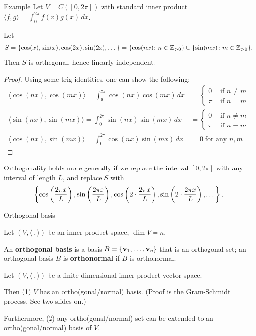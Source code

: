 \begin{frame}{Example}
Let $V=C([0,2\pi])$ with standard inner product $\langle f, g\rangle=\int_0^{2\pi} f(x)g(x) \, dx$. 

Let \[ S=\{\cos(x),\sin(x),\cos(2x),\sin(2x), \dots\}=\{\cos(nx)\colon n\in{\mathbb Z}_{>0}\}\cup\{\sin(mx)\colon m\in{\mathbb Z}_{>0}\}.\] Then $S$ is orthogonal, hence linearly independent. 
\pause
\begin{proof}
Using some trig identities, one can show the following:
\begin{align*}
\langle \cos(nx),\cos(mx)\rangle=\int_0^{2\pi}\cos(nx)\cos(mx)\, dx&=\begin{cases} 0& \text{ if $n\ne m$} \\ \pi& \text{ if $n=m$} \end{cases}\\
\langle \sin(nx),\sin(mx)\rangle=\int_0^{2\pi}\sin(nx)\sin(mx)\, dx&=\begin{cases} 0& \text{ if $n\ne m$} \\ \pi& \text{ if $n=m$} \end{cases}\\
\langle \cos(nx),\sin(mx)\rangle=\int_0^{2\pi}\cos(nx)\sin(mx)\, dx&=0 \text{ for any $n,m$}
\end{align*}
\end{proof}
\pause Orthogonality holds more generally if we replace the interval $[0,2\pi]$ with any interval of length $L$, and replace $S$ with 
\[\scriptsize
\left\{\cos\left(\frac{2\pi x}{L}\right), \sin\left(\frac{2\pi x}{L}\right), \cos\left(2\cdot\frac{2\pi x}{L}\right),\sin\left(2\cdot\frac{2\pi x}{L}\right),\dots\right\}.
\]

\end{frame}
\begin{frame}{Orthogonal basis}
\begin{definition}
Let $(V,\langle \ , \rangle)$ be an inner product space, $\dim V=n$. 

An {\bf orthogonal basis} is a basis $B=\{{\mathbf v}_1,\dots,{\mathbf v}_n\}$ that is an orthogonal set; an orthogonal basis $B$ is {\bf orthonormal} if $B$ is orthonormal.     
\end{definition}
\pause
\begin{theorem}
Let $(V,\langle \ , \rangle)$ be a finite-dimensional inner product vector space. 

Then \alert{(1)} $V$ has an ortho(gonal/normal) basis. (Proof is the \alert{Gram-Schmidt} process. See two slides on.) 

Furthermore, \alert{(2)} any ortho(gonal/normal) set can be \alert{extended} to an ortho(gonal/normal) basis of $V$. 
 \end{theorem}
\end{frame}

